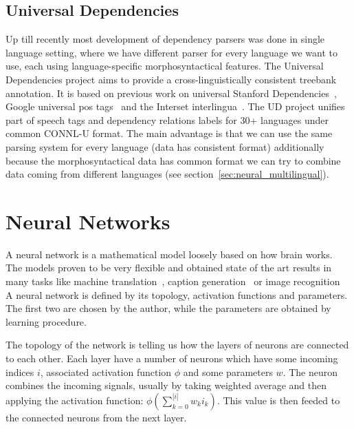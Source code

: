 \subsection{Universal Dependencies}
Up till recently most development of dependency parsers was done in single language
setting, where we have different parser for every language we want to use, each
using language-specific morphosyntactical features. The Universal Dependencies
project \cite{nivre_universal_2015} aims to provide a cross-linguistically consistent
treebank annotation. It is based on previous work on universal Stanford
Dependencies~\cite{marneffe_generating_2006},
Google universal pos tags~\cite{petrov_universal_2011}
and the Interset interlingua~\cite{zeman_reusable_2008}.
The UD project unifies part of speech tags and dependency relations labels
for 30+ languages under common CONNL-U format.
The main advantage is that we can use the same parsing system for every language
(data has consistent format) additionally because the morphosyntactical data has
common format we can try to combine data coming from different languages (see
section~\ref{sec:neural_multilingual}).

\section{Neural Networks}
A neural network is a mathematical model loosely based on how brain works.
The models proven to be very flexible and obtained state of the art results in
many tasks like machine translation~\cite{bahdanau_neural_2014},
caption generation~\cite{xu_show_2015} or image recognition~\cite{szegedy_goglenet_2014}
A neural network is defined by its topology,
activation functions and parameters. The first two are chosen by the author,
while the parameters are obtained by learning procedure.

The topology of the network is telling us how the layers of neurons are connected
to each other. Each layer have a number of neurons which have some incoming
indices $i$, associated activation function $\phi$ and some parameters $w$.
The neuron combines the incoming signals, usually by taking weighted average
and then applying the activation function: $ \phi ( \sum_{k=0}^{|i|} w_ki_k ) $.
This value is then feeded to the connected neurons from the next layer.

